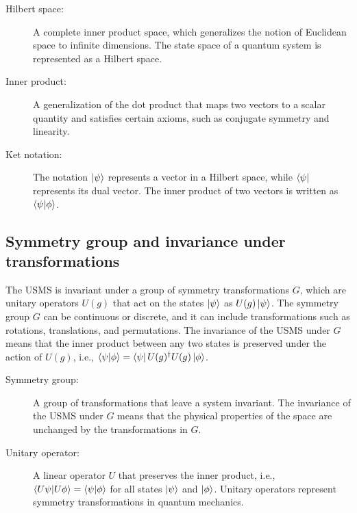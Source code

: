 \begin{tcolorbox}[colback=blue!5!white,colframe=blue!75!black,title=New terms]
\begin{description}
\item[Hilbert space:] A complete inner product space, which generalizes the notion of Euclidean space to infinite dimensions. The state space of a quantum system is represented as a Hilbert space.
\item[Inner product:] A generalization of the dot product that maps two vectors to a scalar quantity and satisfies certain axioms, such as conjugate symmetry and linearity.
\item[Ket notation:] The notation $\ket{\psi}$ represents a vector in a Hilbert space, while $\bra{\psi}$ represents its dual vector. The inner product of two vectors is written as $\braket{\psi|\phi}$.
\end{description}
\end{tcolorbox}

\subsection{Symmetry group and invariance under transformations}
The USMS is invariant under a group of symmetry transformations $G$, which are unitary operators $U(g)$ that act on the states $\ket{\psi}$ as $U(g)\ket{\psi}$. The symmetry group $G$ can be continuous or discrete, and it can include transformations such as rotations, translations, and permutations. The invariance of the USMS under $G$ means that the inner product between any two states is preserved under the action of $U(g)$, i.e., $\braket{\psi|\phi} = \bra{\psi}U(g)^\dagger U(g)\ket{\phi}$.

\begin{tcolorbox}[colback=blue!5!white,colframe=blue!75!black,title=New terms]
\begin{description}
\item[Symmetry group:] A group of transformations that leave a system invariant. The invariance of the USMS under $G$ means that the physical properties of the space are unchanged by the transformations in $G$.
\item[Unitary operator:] A linear operator $U$ that preserves the inner product, i.e., $\braket{U\psi|U\phi} = \braket{\psi|\phi}$ for all states $\ket{\psi}$ and $\ket{\phi}$. Unitary operators represent symmetry transformations in quantum mechanics.
\end{description}
\end{tcolorbox}


